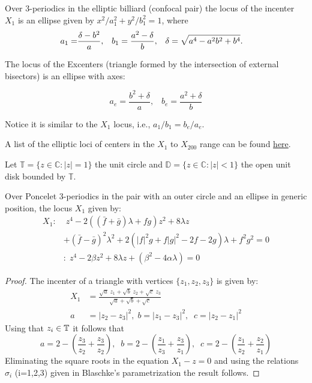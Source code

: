 \begin{theorem}
Over 3-periodics in the elliptic billiard (confocal pair) the locus of the incenter $X_1$ is an ellipse given by 
$x^2/a_1^2+y^2/b_1^2=1$, where
	\begin{equation*}\label{eq:Eint}\aligned
	a_1 =& \frac{\delta-b^2 }{a},\;\;\;
	b_1  =   \frac{a^2-\delta}{b},\;\;\; \delta=\sqrt{a^4-a^2b^2+b^4}.
	\endaligned
	\end{equation*}
	
	The locus of the Excenters (triangle formed by the intersection of external bisectors) is an ellipse with axes:
 
\begin{equation*}
 a_e=\frac{{b}^{2}+\delta}{a},\;\;\; 
 b_e=\frac{{a}^{2}+\delta}{b}
\end{equation*}
 
\noindent Notice it is similar to the $X_1$ locus, i.e., $a_1/b_1=b_e/a_e$.
\end{theorem}

A list of the elliptic loci of centers in the $X_{1}$ to $X_{200}$ range can be found \href{https://dan-reznik.github.io/why-so-many-ellipses/}{here}.

Let  $\mathbb{T } = \{ z\in \mathbb{C}: |z| = 1\} $ the unit circle and $\mathbb{D} = \{ z\in\mathbb{C} : |z| < 1\} $ the open unit disk
bounded by $\mathbb{T }.$

\begin{proposition}\label{prop:X1c}
Over Poncelet 3-periodics in the pair with an outer circle and an ellipse in generic position, the locus $X_1$ given by:
\begin{align*}
  X_1:&\;z^4 - 2(( \bar{f} + \bar{g}) \lambda +  f g) z^2 + 8   \lambda z\\
  &+ (\bar{f} - \bar{g})^2 \lambda^2 +2 (  |f|^2 g +   f |g|^2 - 2 f - 2 g) \lambda + f^2 g^2=0\\
  \;&:\;  z^4 - 2\beta  z^2+ 8\lambda z+  (\beta^2-4\alpha\lambda) =0
\end{align*}
\end{proposition}

\begin{proof} The incenter of a triangle with vertices $\{z_1,z_2,z_3\}$ is given by:
\begin{align*}
    X_1&=\frac{\sqrt{a}\;z_1+\sqrt{b}\;z_2+\sqrt{c}\;z_3}{\sqrt{a}+\sqrt{b}+\sqrt{c}}\\
    a&=|z_2-z_3|^2, \; b=|z_1-z_3|^2, \;\; c=|z_2-z_1|^2
\end{align*}
Using that $z_i\in \mathbb{T}$ it follows that
\[a=2-(\frac{z_3}{z_2}+\frac{z_3}{z_2}),\;\; b=2-(\frac{z_1}{z_3}+\frac{z_3}{z_1}),\;\;c=2-(\frac{z_1}{z_2}+\frac{z_2}{z_1})\]
Eliminating the square roots in  the equation $X_1-z=0$ and using the relations  $\sigma_i$ (i=1,2,3) given in Blaschke's parametrization the result follows.
\end{proof}

